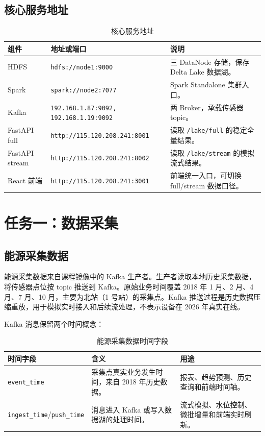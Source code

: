 \documentclass[UTF8,11pt,a4paper]{ctexart}
\newcommand{\code}[1]{\texttt{#1}}
\begin{document}
\subsection{核心服务地址}

\begin{table}[H]
\centering
\small
\begin{tabularx}{\textwidth}{p{2.2cm}p{4.4cm}Y}
\toprule
组件 & 地址或端口 & 说明 \\
\midrule
HDFS & \code{hdfs://node1:9000} & 三 DataNode 存储，保存 Delta Lake 数据湖。 \\
Spark & \code{spark://node2:7077} & Spark Standalone 集群入口。 \\
Kafka & \code{192.168.1.87:9092, 192.168.1.19:9092} & 两 Broker，承载传感器 topic。 \\
FastAPI full & \code{http://115.120.208.241:8001} & 读取 \code{/lake/full} 的稳定全量结果。 \\
FastAPI stream & \code{http://115.120.208.241:8002} & 读取 \code{/lake/stream} 的模拟流式结果。 \\
React 前端 & \code{http://115.120.208.241:3001} & 前端统一入口，可切换 full/stream 数据口径。 \\
\bottomrule
\end{tabularx}
\caption{核心服务地址}
\end{table}

\section{任务一：数据采集}

\subsection{能源采集数据}

能源采集数据来自课程镜像中的 Kafka 生产者。生产者读取本地历史采集数据，将传感器点位按 topic 推送到 Kafka。原始业务时间覆盖 2018 年 1 月、2 月、4 月、7 月、10 月，主要为北站（1 号站）的采集点。Kafka 推送过程是历史数据压缩重放，用于模拟实时接入和后续流处理，不表示设备在 2026 年真实在线。

Kafka 消息保留两个时间概念：

\begin{table}[H]
\centering
\small
\begin{tabularx}{\textwidth}{p{3cm}Yp{4cm}}
\toprule
时间字段 & 含义 & 用途 \\
\midrule
\code{event\_time} & 采集点真实业务发生时间，来自 2018 年历史数据。 & 报表、趋势预测、历史查询和前端时间轴。 \\
\code{ingest\_time}/\code{push\_time} & 消息进入 Kafka 或写入数据湖的处理时间。 & 流式模拟、水位控制、微批增量和前端实时刷新。 \\
\bottomrule
\end{tabularx}
\caption{能源采集数据时间字段}
\end{table}
\end{document}
